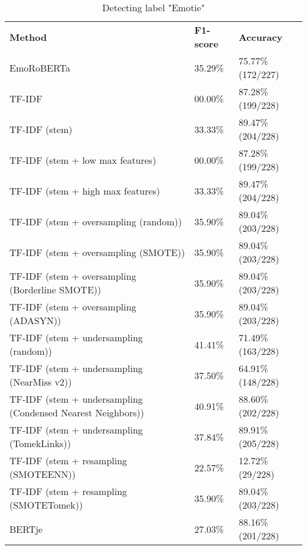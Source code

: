 \documentclass{article}
\begin{document}
\begin{table}[]
\begin{tabular}{lll}
\textbf{Method}                                             & \textbf{F1-score} & \textbf{Accuracy} \\
EmoRoBERTa                                                  & 35.29\%           & 75.77\% (172/227) \\
TF-IDF                                                      & 00.00\%           & 87.28\% (199/228) \\
TF-IDF (stem)                                               & 33.33\%           & 89.47\% (204/228) \\
TF-IDF (stem + low max features)                            & 00.00\%           & 87.28\% (199/228) \\
TF-IDF (stem + high max features)                           & 33.33\%           & 89.47\% (204/228) \\
TF-IDF (stem + oversampling (random))                       & 35.90\%           & 89.04\% (203/228) \\
TF-IDF (stem + oversampling (SMOTE))                        & 35.90\%           & 89.04\% (203/228) \\
TF-IDF (stem + oversampling (Borderline SMOTE))             & 35.90\%           & 89.04\% (203/228) \\
TF-IDF (stem + oversampling (ADASYN))                       & 35.90\%           & 89.04\% (203/228) \\
TF-IDF (stem + undersampling (random))                      & 41.41\%           & 71.49\% (163/228) \\
TF-IDF (stem + undersampling (NearMiss v2))                 & 37.50\%           & 64.91\% (148/228) \\
TF-IDF (stem + undersampling (Condensed Nearest Neighbors)) & 40.91\%           & 88.60\% (202/228) \\
TF-IDF (stem + undersampling (TomekLinks))                  & 37.84\%           & 89.91\% (205/228) \\
TF-IDF (stem + resampling (SMOTEENN))                       & 22.57\%           & 12.72\% (29/228)  \\
TF-IDF (stem + resampling (SMOTETomek))                     & 35.90\%           & 89.04\% (203/228) \\
BERTje                                                      & 27.03\%           & 88.16\% (201/228)
\end{tabular}
\caption{Detecting label "Emotie"}
\label{tab:emotions}
\end{table}
\end{document}
